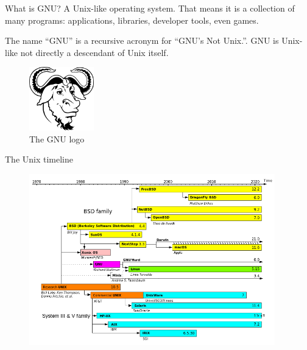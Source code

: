 \documentclass{beamer}
\begin{document}
\begin{frame}{What is GNU?}
	A Unix-like operating system. That means it is a collection of many programs: applications, libraries,
	developer tools, even games.

	The name “GNU” is a recursive acronym for “GNU's Not Unix.”. GNU is Unix-like not directly 
	a descendant of Unix itself.
	\begin{figure}
		\begin{center}
			\includegraphics[width=0.25\textwidth]{images/gnu.png}
		\end{center}
		\caption{The GNU logo}
	\end{figure}
\end{frame}

\begin{frame}{The Unix timeline}
	\begin{figure}
		\begin{center}
			\includegraphics[width=0.95\textwidth]{images/Unix_timeline.png}
		\end{center}
	\end{figure}
\end{frame}
\end{document}
